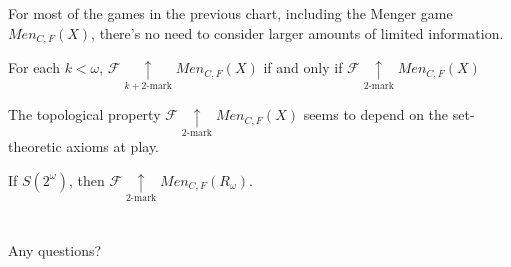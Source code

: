 \documentclass{beamer}
\theoremstyle{definition}
\newcommand{\kmarkwin}[1]{\underset{#1\text{-mark}}{\uparrow}}
\newcommand{\menGame}[1]{Men_{C,F}\left({#1}\right)}
\newcommand{\<}{\langle}
\renewcommand{\>}{\rangle}
\newcommand{\alcompS}[1]{S(#1)}
\newcommand{\pl}[1]{\mathscr{#1}}
\begin{document}
\begin{frame}\small
  For most of the games in the previous chart, including the Menger game
  $\menGame{X}$, there's no need to consider larger amounts of limited
  information.

  \begin{theorem}
    For each $k<\omega$,
    $\pl F\kmarkwin{k+2}\menGame{X}$ if and only if
    $\pl F\kmarkwin2\menGame{X}$
  \end{theorem}

  The topological property $\pl F\kmarkwin2\menGame{X}$ seems to
  depend on the set-theoretic axioms at play.

  \begin{theorem}
    If $\alcompS{2^\omega}$, then $\pl F\kmarkwin2\menGame{R_\omega}$.
  \end{theorem}
\end{frame}

\section{}

\begin{frame}
  Any questions?
\end{frame}


\begin{frame}[allowframebreaks]
  \tiny
  
  
\end{frame}
\end{document}
